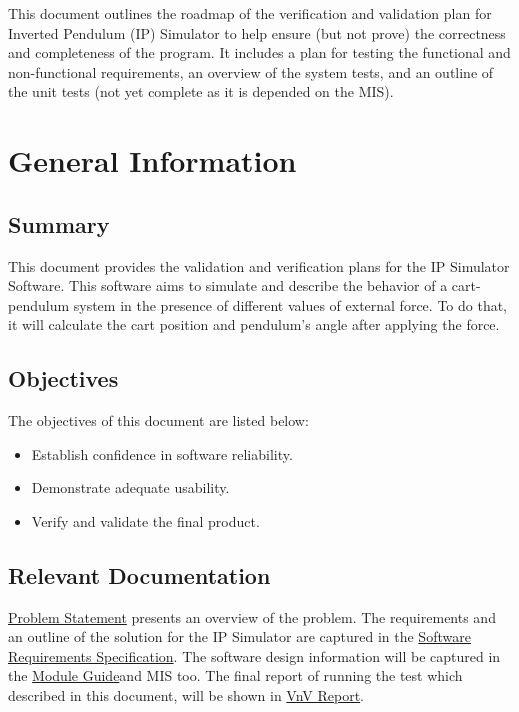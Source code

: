 \documentclass[12pt, titlepage]{article}
\begin{document}

This document outlines the roadmap of the verification and validation plan for Inverted Pendulum (IP) Simulator to help ensure (but not prove) the correctness and completeness of the program.
It includes a plan for testing the functional and non-functional requirements, an overview of the system tests, and an outline of the unit tests (not yet complete as it is depended on the MIS).

\section{General Information}

\subsection{Summary}
This document provides the validation and verification plans for the IP Simulator Software. This software aims to simulate and describe the behavior of a cart-pendulum system in the presence of different values of external force. To do that, it will calculate the cart position and pendulum's angle after applying the force.
\subsection{Objectives}

The objectives of this document are listed below:
\begin{itemize}
\item Establish confidence in software reliability.
\item Demonstrate adequate usability.
\item Verify and validate the final product.
\end{itemize}

\subsection{Relevant Documentation}

\href{https://github.com/MinMah23/CAS741-Project/tree/main/docs/ProblemStatementAndGoals/ProblemStatement.pdf}{Problem Statement} presents an overview of the problem.
The requirements and an outline of the solution for the IP Simulator are captured in the \href{https://github.com/MinMah23/CAS741-Project/tree/main/docs/SRS/SRS.pdf}{Software Requirements Specification}. The software design information will be captured in the \href{https://github.com/MinMah23/CAS741-Project/tree/main/docs/Design}{Module Guide}and MIS too. The final report of running the test which described in this document, will be shown in \href{https://github.com/Maryamvalian/project741/blob/main/docs/VnVReport/VnVReport.pdf}{VnV Report}.
\end{document}
